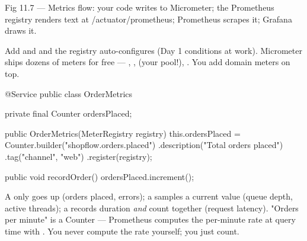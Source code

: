 \begin{wbfigure}{Fig 11.7 --- Metrics flow: your code writes to Micrometer; the Prometheus registry renders text at /actuator/prometheus; Prometheus scrapes it; Grafana draws it.}
\end{wbfigure}

 Add  and  and the registry auto-configures (Day 1 conditions at work). Micrometer ships dozens of meters for free --- , ,  (your pool!), . You add domain meters on top.

\begin{javabox}
@Service
public class OrderMetrics {
  private final Counter ordersPlaced;

  public OrderMetrics(MeterRegistry registry) {
    this.ordersPlaced = Counter.builder("shopflow.orders.placed")
        .description("Total orders placed")
        .tag("channel", "web")
        .register(registry);
  }

  public void recordOrder() { ordersPlaced.increment(); }
}
\end{javabox}

 A  only goes up (orders placed, errors); a  samples a current value (queue depth, active threads); a  records duration \emph{and} count together (request latency). "Orders per minute" is a Counter --- Prometheus computes the per-minute rate at query time with . You never compute the rate yourself; you just count.

